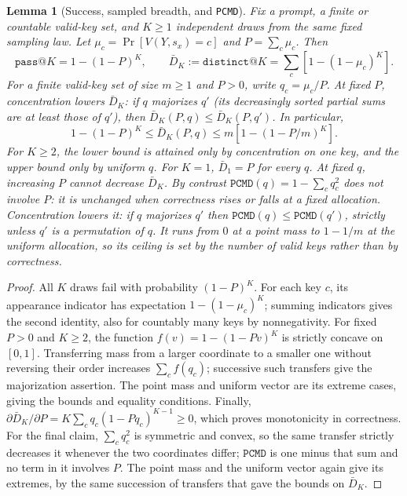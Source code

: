 \documentclass{article}
\newcommand{\1}{\mathbf 1}
\newcommand{\pmd}{\texttt{PCMD}}
\newtheorem{lemma}{Lemma}[section]
\theoremstyle{remark}
\theoremstyle{definition}
\theoremstyle{plain}
\begin{document}
\begin{lemma}[Success, sampled breadth, and \pmd{}]
\label{lem:success-breadth}
Fix a prompt, a finite or countable valid-key set, and $K\ge1$ independent
draws from the same fixed sampling law. Let
$\mu_c=\Pr[V(Y,s_x)=c]$ and $P=\sum_c\mu_c$. Then
\begin{equation}
 \texttt{pass@}K=1-(1-P)^K,\qquad
 \bar D_K:=\texttt{distinct@}K=\sum_c[1-(1-\mu_c)^K].
 \label{eq:success-breadth-identities}
\end{equation}
For a finite valid-key set of size $m\ge1$ and $P>0$, write $q_c=\mu_c/P$.
At fixed $P$, concentration lowers $\bar D_K$: if $q$ majorizes $q'$
(its decreasingly sorted partial sums are at least those of $q'$), then
$\bar D_K(P,q)\le\bar D_K(P,q')$. In particular,
\begin{equation}
 1-(1-P)^K\le\bar D_K(P,q)\le m[1-(1-P/m)^K].
 \label{eq:fixed-success-breadth-bounds}
\end{equation}
For $K\ge2$, the lower bound is attained only by concentration on one key,
and the upper bound only by uniform $q$. For $K=1$, $\bar D_1=P$ for every $q$.
At fixed $q$, increasing $P$ cannot decrease $\bar D_K$.
By contrast $\pmd(q)=1-\sum_c q_c^2$ does not involve $P$: it is unchanged when
correctness rises or falls at a fixed allocation. Concentration lowers it: if
$q$ majorizes $q'$ then $\pmd(q)\le\pmd(q')$, strictly unless $q'$ is a
permutation of $q$. It runs from $0$ at a point mass to
$1-1/m$ at the uniform allocation, so its ceiling is set by the number of
valid keys rather than by correctness.
\end{lemma}
\begin{proof}
All $K$ draws fail with probability $(1-P)^K$. For each key $c$, its
appearance indicator has expectation $1-(1-\mu_c)^K$; summing indicators
gives the second identity, also for countably many keys by nonnegativity.
For fixed $P>0$ and $K\ge2$, the function
$f(v)=1-(1-Pv)^K$ is strictly concave on $[0,1]$.
Transferring mass from a larger coordinate to a smaller one without reversing
their order increases $\sum_c f(q_c)$; successive such transfers give the
majorization assertion. The point mass and uniform vector are its extreme
cases, giving the bounds and equality conditions. Finally,
$\partial\bar D_K/\partial P=K\sum_c q_c(1-Pq_c)^{K-1}\ge0$,
which proves monotonicity in correctness.
For the final claim, $\sum_c q_c^2$ is symmetric and convex, so the
same transfer strictly decreases it whenever the two coordinates differ;
$\pmd$ is one minus that sum and no term in it involves $P$. The point mass and
the uniform vector again give its extremes, by the same succession of transfers
that gave the bounds on $\bar D_K$.
\end{proof}
\end{document}
